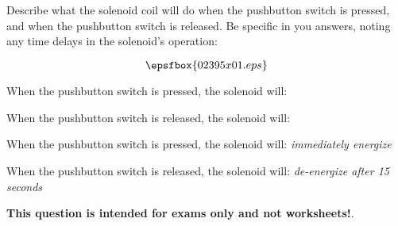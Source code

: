 

Describe what the solenoid coil will do when the pushbutton switch is pressed, and when the pushbutton switch is released.  Be specific in you answers, noting any time delays in the solenoid's operation:

$$\epsfbox{02395x01.eps}$$

When the pushbutton switch is pressed, the solenoid will:

\vskip 20pt

When the pushbutton switch is released, the solenoid will:







When the pushbutton switch is pressed, the solenoid will: {\it immediately energize}

\vskip 10pt

When the pushbutton switch is released, the solenoid will: {\it de-energize after 15 seconds}







{\bf This question is intended for exams only and not worksheets!}.




